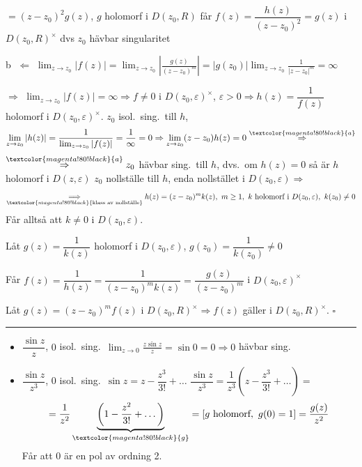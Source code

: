 $= (z - z_0)^2 g(z)$, $g$ holomorf i $D(z_0, R)$ får $f(z) = \dfrac{h(z)}{(z - z_0)^2} = g(z)$ i $D(z_0, R)^\times$ dvs $z_0$ hävbar singularitet

\textcircled{b} $\Leftarrow$ \quad $\displaystyle\lim_{z \to z_0} |f(z)| = \lim_{z \to z_0} \left| \frac{g(z)}{(z - z_0)^m} \right| = |g(z_0)| \lim_{z \to z_0} \frac{1}{|z - z_0|^m} = \infty$

$\Rightarrow$ \quad $\displaystyle\lim_{z \to z_0} |f(z)| = \infty \Rightarrow f \neq 0$ i $D(z_0, \varepsilon)^\times$, $\varepsilon > 0 \Rightarrow h(z) = \dfrac{1}{f(z)}$ holomorf i $D(z_0, \varepsilon)^\times$. $z_0$ isol.\ sing.\ till $h$,
\[ \lim_{z \to z_0} |h(z)| = \frac{1}{\lim_{z \to z_0} |f(z)|} = \frac{1}{\infty} = 0 \Rightarrow \lim_{z \to z_0} (z - z_0)h(z) = 0 \overset{\textcolor{magenta!80!black}{a}}{\Rightarrow} \]
$\overset{\textcolor{magenta!80!black}{a}}{\Rightarrow} z_0$ hävbar sing.\ till $h$, dvs.\ om $h(z) = 0$ så är $h$ holomorf i $D(z, \varepsilon)$ $z_0$ nollställe till $h$, enda nollstället i $D(z_0, \varepsilon) \Longrightarrow$
\[ \underset{\textcolor{magenta!80!black}{\text{klass av nollställe}}}{\Longrightarrow} h(z) = (z - z_0)^m k(z),\ m \ge 1,\ k \text{ holomorf i } D(z_0, \varepsilon),\ k(z_0) \neq 0 \]
Får alltså att $k \neq 0$ i $D(z_0, \varepsilon)$.

Låt $g(z) = \dfrac{1}{k(z)}$ holomorf i $D(z_0, \varepsilon)$, $g(z_0) = \dfrac{1}{k(z_0)} \neq 0$

Får $f(z) = \dfrac{1}{h(z)} = \dfrac{1}{(z - z_0)^m k(z)} = \dfrac{g(z)}{(z - z_0)^m}$ i $D(z_0, \varepsilon)^\times$

Låt $g(z) = (z - z_0)^m f(z)$ i $D(z_0, R)^\times \Rightarrow f(z)$ gäller i $D(z_0, R)^\times$. \hfill $\square$

\noindent\rule{\linewidth}{0.4pt}

\begin{example}
\begin{itemize}
  \item $\dfrac{\sin z}{z}$, $0$ isol.\ sing.\ \quad $\displaystyle\lim_{z \to 0} \frac{z \sin z}{z} = \sin 0 = 0 \Rightarrow 0$ hävbar sing.
  \item $\dfrac{\sin z}{z^3}$, $0$ isol.\ sing.\ \quad $\sin z = z - \dfrac{z^3}{3!} + \dots$ \quad $\dfrac{\sin z}{z^3} = \dfrac{1}{z^3}\left( z - \dfrac{z^3}{3!} + \dots \right) =$
  \[ = \frac{1}{z^2}\underbrace{\left( 1 - \frac{z^2}{3!} + \dots \right)}_{\textcolor{magenta!80!black}{g}} = [g \text{ holomorf},\ g(0) = 1] = \frac{g(z)}{z^2} \]
  Får att $0$ är en pol av ordning 2.
\end{itemize}
\end{example}

